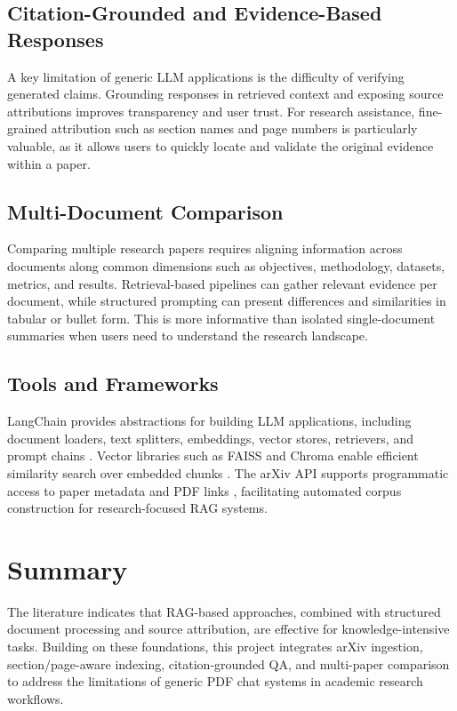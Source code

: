 \subsection{Citation-Grounded and Evidence-Based Responses}
A key limitation of generic LLM applications is the difficulty of verifying generated claims. Grounding responses in retrieved context and exposing source attributions improves transparency and user trust. For research assistance, fine-grained attribution such as section names and page numbers is particularly valuable, as it allows users to quickly locate and validate the original evidence within a paper.

\subsection{Multi-Document Comparison}
Comparing multiple research papers requires aligning information across documents along common dimensions such as objectives, methodology, datasets, metrics, and results. Retrieval-based pipelines can gather relevant evidence per document, while structured prompting can present differences and similarities in tabular or bullet form. This is more informative than isolated single-document summaries when users need to understand the research landscape.

\subsection{Tools and Frameworks}
LangChain provides abstractions for building LLM applications, including document loaders, text splitters, embeddings, vector stores, retrievers, and prompt chains \cite{b5,b6,b7}. Vector libraries such as FAISS and Chroma enable efficient similarity search over embedded chunks \cite{b10,b11}. The arXiv API supports programmatic access to paper metadata and PDF links \cite{b12}, facilitating automated corpus construction for research-focused RAG systems.

\section{Summary}
The literature indicates that RAG-based approaches, combined with structured document processing and source attribution, are effective for knowledge-intensive tasks. Building on these foundations, this project integrates arXiv ingestion, section/page-aware indexing, citation-grounded QA, and multi-paper comparison to address the limitations of generic PDF chat systems in academic research workflows.